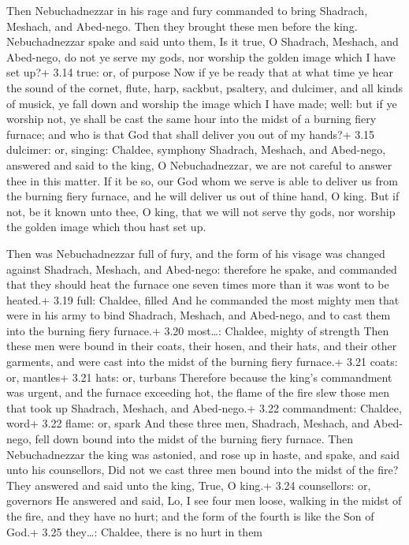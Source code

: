  Then Nebuchadnezzar in his rage and fury commanded to
bring Shadrach, Meshach, and Abed-nego. Then they brought these men
before the king.  Nebuchadnezzar spake and said unto them,
Is it true, O Shadrach, Meshach, and Abed-nego, do not ye serve my gods,
nor worship the golden image which I have set up?+ 3.14 true: or, of
purpose  Now if ye be ready that at what time ye hear the
sound of the cornet, flute, harp, sackbut, psaltery, and dulcimer, and
all kinds of musick, ye fall down and worship the image which I have
made; well: but if ye worship not, ye shall be cast the same hour into
the midst of a burning fiery furnace; and who is that God that shall
deliver you out of my hands?+ 3.15 dulcimer: or, singing: Chaldee,
symphony  Shadrach, Meshach, and Abed-nego, answered and
said to the king, O Nebuchadnezzar, we are not careful to answer thee in
this matter.  If it be so, our God whom we serve is able to
deliver us from the burning fiery furnace, and he will deliver us out of
thine hand, O king.  But if not, be it known unto thee, O
king, that we will not serve thy gods, nor worship the golden image
which thou hast set up.

 Then was Nebuchadnezzar full of fury, and the form of
his visage was changed against Shadrach, Meshach, and Abed-nego:
therefore he spake, and commanded that they should heat the furnace one
seven times more than it was wont to be heated.+ 3.19 full: Chaldee,
filled  And he commanded the most mighty men that were in
his army to bind Shadrach, Meshach, and Abed-nego, and to cast them into
the burning fiery furnace.+ 3.20 most\ldots: Chaldee, mighty of strength
 Then these men were bound in their coats, their hosen, and
their hats, and their other garments, and were cast into the midst of
the burning fiery furnace.+ 3.21 coats: or, mantles+ 3.21 hats: or,
turbans  Therefore because the king's commandment was
urgent, and the furnace exceeding hot, the flame of the fire slew those
men that took up Shadrach, Meshach, and Abed-nego.+ 3.22 commandment:
Chaldee, word+ 3.22 flame: or, spark  And these three men,
Shadrach, Meshach, and Abed-nego, fell down bound into the midst of the
burning fiery furnace.  Then Nebuchadnezzar the king was
astonied, and rose up in haste, and spake, and said unto his
counsellors, Did not we cast three men bound into the midst of the fire?
They answered and said unto the king, True, O king.+ 3.24 counsellors:
or, governors  He answered and said, Lo, I see four men
loose, walking in the midst of the fire, and they have no hurt; and the
form of the fourth is like the Son of God.+ 3.25 they\ldots: Chaldee,
there is no hurt in them

